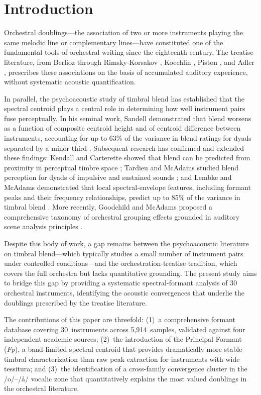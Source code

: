 \documentclass[12pt,a4paper]{article}
\begin{document}
\section{Introduction}

Orchestral doublings---the association of two or more instruments playing the
same melodic line or complementary lines---have constituted one of the
fundamental tools of orchestral writing since the eighteenth century. The
treatise literature, from Berlioz \citep{Berlioz1844} through Rimsky-Korsakov
\citep{RimskyKorsakov1908}, Koechlin \citep{Koechlin1943}, Piston
\citep{Piston1955}, and Adler \citep{Adler1982}, prescribes these associations
on the basis of accumulated auditory experience, without systematic acoustic
quantification.

In parallel, the psychoacoustic study of timbral blend has established that the
spectral centroid plays a central role in determining how well instrument pairs
fuse perceptually. In his seminal work, Sandell demonstrated that blend worsens
as a function of composite centroid height and of centroid difference between
instruments, accounting for up to 63\% of the variance in blend ratings for
dyads separated by a minor third \citep{Sandell1991,Sandell1995}. Subsequent
research has confirmed and extended these findings: Kendall and Carterette
showed that blend can be predicted from proximity in perceptual timbre space
\citep{Kendall1993}; Tardieu and McAdams studied blend perception for dyads of
impulsive and sustained sounds \citep{Tardieu2012}; and Lembke and McAdams
demonstrated that local spectral-envelope features, including formant peaks and
their frequency relationships, predict up to 85\% of the variance in timbral
blend \citep{Lembke2017}. More recently, Goodchild and McAdams proposed a
comprehensive taxonomy of orchestral grouping effects grounded in auditory scene
analysis principles \citep{Goodchild2018,McAdams2022}.

Despite this body of work, a gap remains between the psychoacoustic literature
on timbral blend---which typically studies a small number of instrument pairs
under controlled conditions---and the orchestration-treatise tradition, which
covers the full orchestra but lacks quantitative grounding. The present study
aims to bridge this gap by providing a systematic spectral-formant analysis
of 30 orchestral instruments, identifying the acoustic convergences that
underlie the doublings prescribed by the treatise literature.

The contributions of this paper are threefold: (1)~a comprehensive formant
database covering 30~instruments across 5,914~samples, validated against four
independent academic sources; (2)~the introduction of the Principal Formant
(\textit{Fp}), a band-limited spectral centroid that provides dramatically more
stable timbral characterization than raw peak extraction for instruments with
wide tessitura; and (3)~the identification of a cross-family convergence cluster
in the /o/--/\aa/ vocalic zone that quantitatively explains the most valued
doublings in the orchestral literature.
\end{document}
